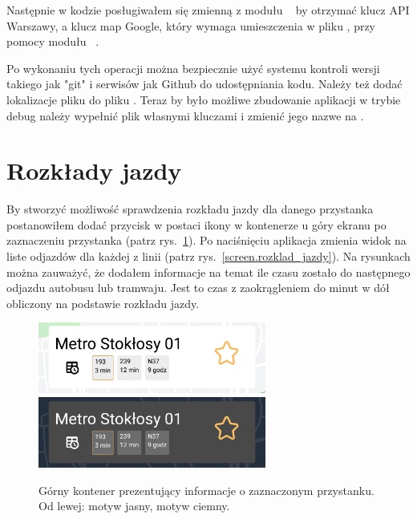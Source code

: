 \documentclass{SGGW-thesis}
\begin{document}
Następnie w kodzie posługiwałem się zmienną  z modułu ~\cite{REACTCONFIG} by otrzymać klucz API Warszawy,
a klucz map Google, który wymaga umieszczenia w pliku , przy pomocy modułu ~\cite{REACTDOTENV}.

Po wykonaniu tych operacji można bezpiecznie użyć systemu kontroli wersji takiego jak "git" i serwisów jak Github do udostępniania kodu.
Należy też dodać lokalizacje pliku  do pliku .
Teraz by było możliwe zbudowanie aplikacji w trybie debug należy wypełnić plik  własnymi kluczami i zmienić jego nazwe na .

\section{Rozkłady jazdy}
By stworzyć możliwość sprawdzenia rozkładu jazdy dla danego przystanka postanowiłem dodać przycisk w postaci ikony w kontenerze u góry ekranu po zaznaczeniu przystanka (patrz rys.~\ref{screen.topbox}).
Po naciśnięciu aplikacja zmienia widok na liste odjazdów dla każdej z linii (patrz rys.~\ref{screen.rozklad_jazdy}).
Na rysunkach można zauważyć, że dodałem informacje na temat ile czasu zostało do następnego odjazdu autobusu lub tramwaju.
Jest to czas z zaokrągleniem do minut w dół obliczony na podstawie rozkładu jazdy.
\begin{figure}[b]
  \centering
  \includegraphics[width=75mm]{screeny/topbox_jasny}
  \enspace
  \includegraphics[width=75mm]{screeny/topbox_ciemny}
  \caption[Górny kontener]{
    \label{screen.topbox}
    Górny kontener prezentujący informacje o zaznaczonym przystanku. Od lewej: motyw jasny, motyw ciemny. \vspace{2ex}
  }
\end{figure}
\end{document}
